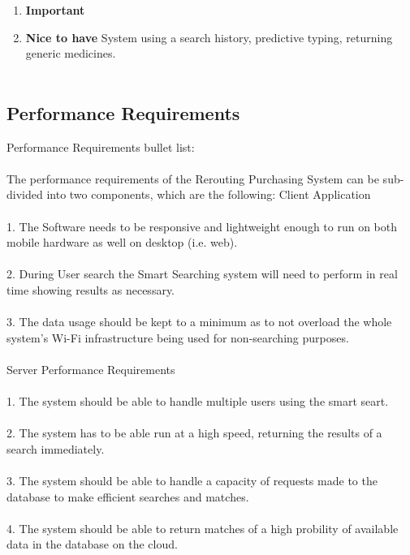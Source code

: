 \documentclass[a4paper,10pt]{article}
\begin{document}
{\begin{enumerate}
\begin{itemize}
				\item Logout
			\end{itemize} 
		\item \textbf{Important} 

		\item \textbf{Nice to have}
		System using a search history, predictive typing, returning generic medicines. \\\\
		\end{enumerate} 

	\subsection{Performance Requirements}
	{Performance Requirements bullet list:\\\\
	The performance requirements of the Rerouting Purchasing System can be sub-divided into two components, which are the following:
	Client Application\\\\
	1.	The Software needs to be responsive and lightweight enough to run on both mobile hardware as well on desktop (i.e. web).\\\\
	2.	During User search the Smart Searching system will need to perform in real time showing results as necessary.\\\\
	3.	The data usage should be kept to a minimum as to not overload the whole system's Wi-Fi infrastructure being used for non-searching purposes.\\\\
	
	Server Performance Requirements\\\\
	1.	The system should be able to handle multiple users using the smart seart.\\\\
	2.	The system has to be able run at a high speed, returning the results of a search immediately.\\\\
	3.	The system should be able to handle a capacity of requests made to the database to make efficient searches and matches. \\\\
	4.	The system should be able to return matches of a high probility of available data in the database on the cloud.\\\\
	
}}
\end{document}
